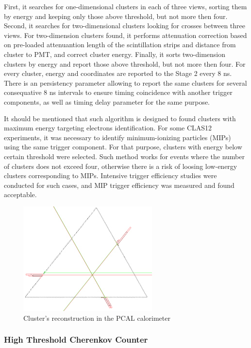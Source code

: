 First, it searches for one-dimensional clusters in each of three views, sorting them by energy and keeping only those above threshold, but not more then four. Second, it searches for two-dimensional clusters looking for crosses between three views. For two-dimension clusters found, it performs attenuation correction based on pre-loaded attenuantion length of the scintillation strips and distance from cluster to PMT, and correct cluster energy. Finally, it sorts two-dimension clusters by energy and report those above threshold, but not more then four. For every cluster, energy and coordinates are reported to the Stage 2 every 8 ns. There is an persistency parameter allowing to report the same clusters for several consequative 8 ns intervals to ensure timing coincidence with another trigger components, as well as timing delay parameter for the same purpose.

It should be mentioned that such algorithm is designed to found clusters with maximum energy targeting electrons identification. For some CLAS12 experiments, it was necessary to identify minimum-ionizing particles (MIPs) using the same trigger component. For that purpose, clusters with energy below certain threshold were selected. Such method works for events where the number of clusters does not exceed four, otherwise there is a risk of loosing low-energy clusters corresponding to MIPs. Intensive trigger efficiency studies were conducted for such cases, and MIP trigger efficiency was measured and found acceptable.

\begin{figure}[htp]
	\begin{center}
		\centering
		\includegraphics[width=7cm]{img/pcal1.png}
		\caption{Cluster's reconstruction in the PCAL calorimeter}
		\label{fig:PCAL}
	\end{center}
\end{figure} 


\subsubsection{High Threshold Cherenkov Counter}
\label{sec:HTCC}

